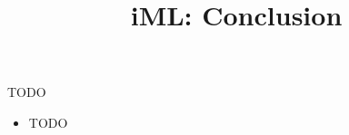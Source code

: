 \documentclass[aspectratio=169]{../latex_main/tntbeamer}  %
\title[Conclusion]{iML: Conclusion}
\subtitle{}
\begin{document}
	
	\maketitle


\begin{frame}[c]{TODO}
 
	\begin{itemize}
		\item TODO
	\end{itemize}
\end{frame}






\end{document}
